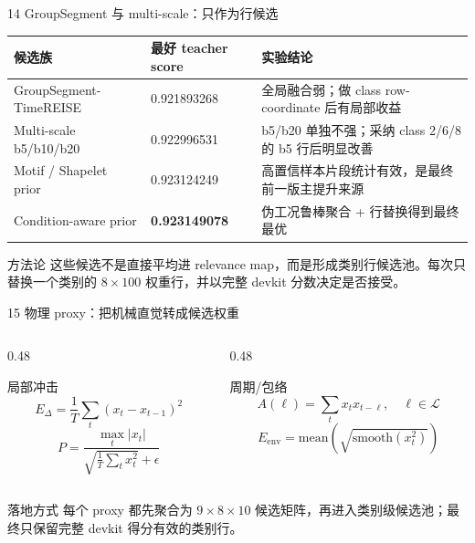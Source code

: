 \documentclass[aspectratio=169]{beamer}
\begin{document}
\begin{frame}{14 GroupSegment 与 multi-scale：只作为行候选}
    \small
    \begin{table}
        \centering
        \scriptsize
        \begin{tabular}{p{}p{}p{}}
            \toprule
            候选族 & 最好 teacher score & 实验结论 \\
            \midrule
            GroupSegment-TimeREISE & 0.921893268 & 全局融合弱；做 class row-coordinate 后有局部收益 \\
            Multi-scale b5/b10/b20 & 0.922996531 & b5/b20 单独不强；采纳 class 2/6/8 的 b5 行后明显改善 \\
            Motif / Shapelet prior & 0.923124249 & 高置信样本片段统计有效，是最终前一版主提升来源 \\
            Condition-aware prior & \textbf{0.923149078} & 伪工况鲁棒聚合 + 行替换得到最终最优 \\
            \bottomrule
        \end{tabular}
    \end{table}
    \begin{block}{方法论}
        这些候选不是直接平均进 relevance map，而是形成类别行候选池。每次只替换一个类别的 $8\times100$ 权重行，并以完整 devkit 分数决定是否接受。
    \end{block}
\end{frame}

\begin{frame}{15 物理 proxy：把机械直觉转成候选权重}
    \small
    \begin{columns}[T,onlytextwidth]
        \begin{column}{0.48\textwidth}
            \begin{block}{局部冲击}
                \[
                    E_{\Delta}=\frac{1}{T}\sum_t(x_t-x_{t-1})^2
                \]
                \[
                    P=\frac{\max_t |x_t|}{\sqrt{\frac{1}{T}\sum_t x_t^2}+\epsilon}
                \]
            \end{block}
        \end{column}
        \begin{column}{0.48\textwidth}
            \begin{block}{周期/包络}
                \[
                    A(\ell)=\sum_t x_t x_{t-\ell},\quad \ell\in\mathcal{L}
                \]
                \[
                    E_{\mathrm{env}}=\mathrm{mean}(\sqrt{\mathrm{smooth}(x_t^2)})
                \]
            \end{block}
        \end{column}
    \end{columns}
    \begin{block}{落地方式}
        每个 proxy 都先聚合为 $9\times8\times10$ 候选矩阵，再进入类别级候选池；最终只保留完整 devkit 得分有效的类别行。
    \end{block}
\end{frame}
\end{document}
